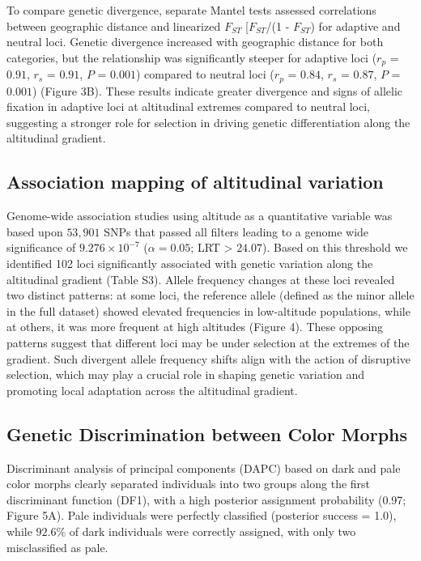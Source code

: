 \documentclass[9pt,a4paper,twoside]{rho-class/rho}
\begin{document}
        To compare genetic divergence, separate Mantel tests assessed correlations between geographic distance and linearized $F_{ST}$ [$F_{ST}$/(1 - $F_{ST}$) for adaptive and neutral loci. Genetic divergence increased with geographic distance for both categories, but the relationship was significantly steeper for adaptive loci (\textit{$r_p$} = $0.91$, \textit{$r_s$} = $0.91$, \textit{$P$} = $0.001$) compared to neutral loci (\textit{$r_p$} = $0.84$, \textit{$r_s$} = $0.87$, \textit{$P$} = $0.001$) (Figure 3B). These results indicate greater divergence and signs of allelic fixation in adaptive loci at altitudinal extremes compared to neutral loci, suggesting a stronger role for selection in driving genetic differentiation along the altitudinal gradient.

    \subsection{Association mapping of altitudinal variation}

        Genome-wide association studies using altitude as a quantitative variable was based upon $53,901$ SNPs that passed all filters leading to a genome wide significance of $9.276\times10^{-7}$ ($\alpha = 0.05$; LRT > $24.07$). Based on this threshold we identified 102 loci significantly associated with genetic variation along the altitudinal gradient (Table S3). Allele frequency changes at these loci revealed two distinct patterns: at some loci, the reference allele (defined as the minor allele in the full dataset) showed elevated frequencies in low-altitude populations, while at others, it was more frequent at high altitudes (Figure 4). These opposing patterns suggest that different loci may be under selection at the extremes of the gradient. Such divergent allele frequency shifts align with the action of disruptive selection, which may play a crucial role in shaping genetic variation and promoting local adaptation across the altitudinal gradient.

    \subsection{Genetic Discrimination between Color Morphs}

        Discriminant analysis of principal components (DAPC) based on dark and pale color morphs clearly separated individuals into two groups along the first discriminant function (DF1), with a high posterior assignment probability (0.97; Figure 5A). Pale individuals were perfectly classified (posterior success = 1.0), while $92.6\%$ of dark individuals were correctly assigned, with only two misclassified as pale.
   
\end{document}

